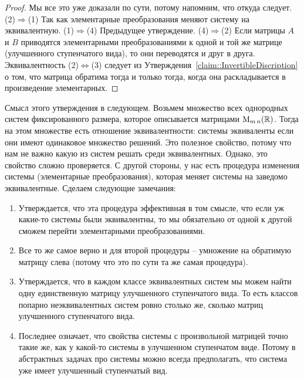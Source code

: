 \begin{proof}
Мы все это уже доказали по сути, потому напомним, что откуда следует.
(2)$\Rightarrow$(1) Так как элементарные преобразования меняют систему на эквивалентную.
(1)$\Rightarrow$(4)  Предыдущее утверждение.
(4)$\Rightarrow$(2) Если матрицы $A$ и $B$ приводятся элементарными преобразованиями к одной и той же матрице (улучшенного ступенчатого вида), то они переводятся и друг в друга.
Эквивалентность (2)$\Leftrightarrow$(3) следует из Утверждения~\ref{claim::InvertibleDiscription} о том, что матрица обратима тогда и только тогда, когда она раскладывается в произведение элементарных.
\end{proof}

Смысл этого утверждения в следующем.
Возьмем множество всех однородных систем фиксированного размера, которое описывается матрицами $\operatorname{M}_{m\,n}(\mathbb R)$.
Тогда на этом множестве есть отношение эквивалентности: системы эквиваленты если они имеют одинаковое множество решений.
Это полезное свойство, потому что нам не важно какую из систем решать среди эквивалентных.
Однако, это свойство сложно проверяется.
С другой стороны, у нас есть процедура изменения системы (элементарные преобразования), которая меняет системы на заведомо эквивалентные.
Сделаем следующие замечания:
\begin{enumerate}
\item Утверждается, что эта процедура эффективная в том смысле, что если уж какие-то системы были эквивалентны, то мы обязательно от одной к другой сможем перейти элементарными преобразованиями.

\item Все то же самое верно и для второй процедуры -- умножение на обратимую матрицу слева (потому что это по сути та же самая процедура).

\item Утверждается, что в каждом классе эквивалентных систем мы можем найти одну единственную матрицу улучшенного ступенчатого вида.
То есть классов попарно неэквивалентных систем ровно столько же, сколько матриц улучшенного ступенчатого вида.

\item Последнее означает, что свойства системы с произвольной матрицей точно такие же, как у какой-то системы в улучшенном ступенчатом виде.
Потому в абстрактных задачах про системы можно всегда предполагать, что система уже имеет улучшенный ступенчатый вид.
\end{enumerate}
